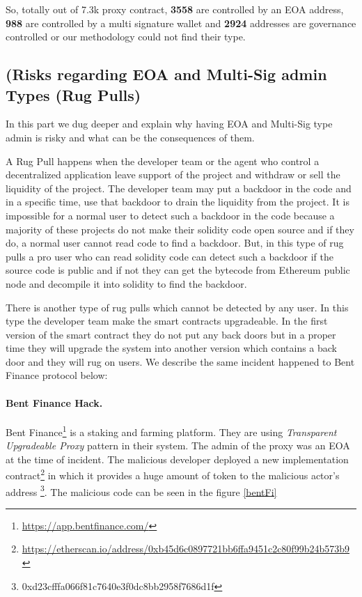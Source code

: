 So, totally out of 7.3k proxy contract, \textbf{3558} are controlled by an EOA address, \textbf{988} are controlled by a multi signature wallet and \textbf{2924} addresses are governance controlled or our methodology could not find their type.


\subsection{(Risks regarding EOA and Multi-Sig admin Types (Rug Pulls)}
In this part we dug deeper and explain why having EOA and Multi-Sig type admin is risky and what can be the consequences of them.

A Rug Pull happens when the developer team or the agent who control a decentralized application leave support of the project and withdraw or sell the liquidity of the project\cite{rugPool}.
The developer team may put a backdoor in the code and in a specific time, use that backdoor to drain the liquidity from the project. It is impossible for a normal user to detect such a backdoor in the code because a majority of these projects do not make their solidity code open source and if they do, a normal user cannot read code to find a backdoor. But, in this type of rug pulls a pro user who can read solidity code can detect such a backdoor if the source code is public and if not they can get the bytecode from Ethereum public node and decompile it into solidity to find the backdoor.

There is another type of rug pulls which cannot be detected by any user. In this type the developer team make the smart contracts upgradeable. In the first version of the smart contract they do not put any back doors but in a proper time they will upgrade the system into another version which contains a back door and they will rug on users. We describe the same incident happened to Bent Finance protocol below:

\paragraph{Bent Finance Hack.}
Bent Finance\footnote{\url{https://app.bentfinance.com/}} is a staking and farming platform. They are using \textit{Transparent Upgradeable Proxy} pattern in their system. The admin of the proxy was an EOA at the time of incident. The malicious developer deployed a new implementation contract\footnote{\url{https://etherscan.io/address/0xb45d6c0897721bb6ffa9451c2c80f99b24b573b9}} in which it provides a huge amount of token to the malicious actor's address \footnote{0xd23cfffa066f81c7640e3f0dc8bb2958f7686d1f}. The malicious code can be seen in the figure \ref{bentFi}

